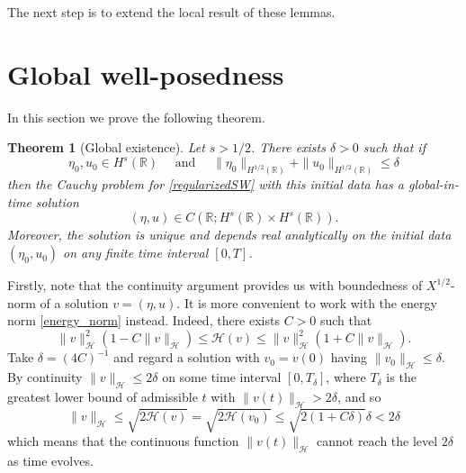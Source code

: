 \documentclass[reqno,12pt,a4paper]{article}
\theoremstyle{plain}
\newtheorem{theorem}{\bf Theorem}[section]
\newcommand{\R}{\mathbb{R}}
\begin{document}
The next step is to extend the local result of these lemmas.




\section{Global well-posedness}
\setcounter{equation}{0}
%
\noindent
%
%
In this section we prove the following theorem.


\begin{theorem}
[Global existence]
\label{mainthm}
	Let $s > 1/2$.
	There exists $\delta>0$ such that if
	$$
        \eta_0, u_0 \in H^s(\R)
        \quad
        \text{ and }
        \quad
		\| \eta_0\|_{H^{1/2}(\R)}+ \| u_0\|_{H^{1/2}(\R)}
		\leqslant \delta
	$$
	then the Cauchy problem for \eqref{regularizedSW}
	with this initial data
	has a global-in-time solution 
	$$
		(\eta, u) \in C\left( \R; H^s(\R) \times H^s(\R)\right).
	$$
	Moreover,
	the solution is unique and
	depends real analytically on the initial data $(\eta_0, u_0) $
	on any finite time interval $[0, T]$.
\end{theorem}


Firstly, note that
the continuity argument provides us with boundedness
of $X^{1/2}$-norm of a solution $v = (\eta, u)$.
It is more convenient to work with the energy norm \eqref{energy_norm} instead.
Indeed,
there exists $C > 0$ such that
\[
	\lVert v \rVert ^2_{\mathcal H}
	( 1 - C \lVert v \rVert _{\mathcal H} )
	\leqslant
	\mathcal H(v)
	\leqslant
	\lVert v \rVert ^2_{\mathcal H}
	( 1 + C \lVert v \rVert_{\mathcal H} )
	.
\]
Take $\delta = (4C)^{-1}$
and regard a solution with $v_0 = v(0)$
having $\lVert v_0 \rVert _{\mathcal H} \leqslant \delta$.
By continuity
$\lVert v \rVert _{\mathcal H} \leqslant 2 \delta$
on some time interval $[0, T_{\delta}]$,
where $T_{\delta}$ is the greatest lower bound of admissible $t$
with $\lVert v(t) \rVert _{\mathcal H} > 2\delta$,
and so
\[
	\lVert v \rVert _{\mathcal H}
	\leqslant
	\sqrt{2 \mathcal H(v)} = \sqrt{2 \mathcal H(v_0)}
	\leqslant
	\sqrt{ 2 (1 + C \delta) } \delta < 2 \delta
\]
which means that
the continuous function
$\lVert v(t) \rVert _{\mathcal H}$ cannot reach the level
$2\delta$ as time evolves.
\end{document}
